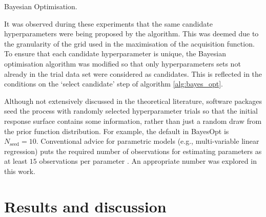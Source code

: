 \begin{algorithm}
\BlankLine
{}
\caption{Bayesian Optimisation.\label{alg:bayes_opt}}
\end{algorithm}

It was observed during these experiments that the same candidate hyperparameters were being proposed by the algorithm. This was deemed due to the granularity of the grid used in the maximisation of the acquisition function. To ensure that each candidate hyperparameter is unique, the Bayesian optimisation algorithm was modified so that only  hyperparameters sets not already in the trial data set were considered as candidates. This is reflected in the conditions on the `select candidate' step of algorithm \ref{alg:bayes_opt}.

Although not extensively discussed in the theoretical literature, software packages seed the process with randomly selected hyperparameter trials so that the initial response surface contains some information, rather than just a random draw from the prior function distribution. For example, the default in BayesOpt \cite{martinez-cantinBayesOptBayesianOptimization2014} is $N_{\mathrm{seed}} = 10$. Conventional advice  for parametric models (e.g., multi-variable linear regression) puts the required number of observations for estimating parameters as at least $15$ observations per parameter \cite{harrelRegressionModelingStrategies2015}. An appropriate number was explored in this work. 


\section{Results and discussion}\label{sec:msm_results}
